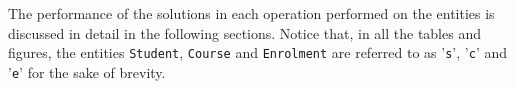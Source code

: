 % 


The performance of the solutions in each
operation performed on the entities is discussed in detail in the following
sections.  Notice that,  in all the tables and figures,   the
entities \texttt{Student},  \texttt{Course} and \texttt{Enrolment} are referred
to as '\texttt{s}',  '\texttt{c}' and '\texttt{e}' for the sake of brevity. 


